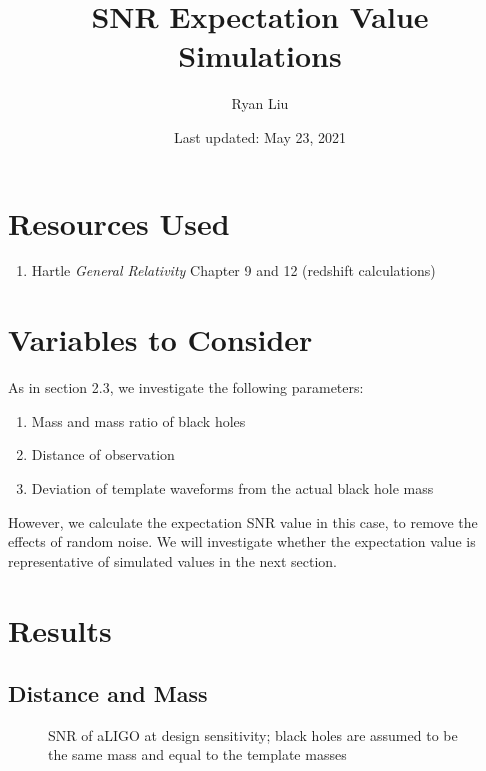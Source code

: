 \documentclass{article}
\title{SNR Expectation Value Simulations}
\author{Ryan Liu}
\date{Last updated: May 23, 2021}
\begin{document}
\maketitle

\section{Resources Used}

\begin{enumerate}
    \item Hartle \textit{General Relativity} Chapter 9 and 12 (redshift calculations)
\end{enumerate}

\section{Variables to Consider}

As in section 2.3, we investigate the following parameters: 
\begin{enumerate}
    \setlength{\itemsep}{0pt}
    \item Mass and mass ratio of black holes 
    \item Distance of observation 
    \item Deviation of template waveforms from the actual black hole mass
\end{enumerate}
However, we calculate the expectation SNR value in this case, to remove the effects of random noise. We will investigate whether the expectation value is representative of simulated values in the next section. 


\section{Results}

\subsection{Distance and Mass}

\begin{figure}[!htb]
    \caption{\label{fig:massdistance} SNR of aLIGO at design sensitivity; black holes are assumed to be the same mass and equal to the template masses}
\end{figure}
\end{document}
